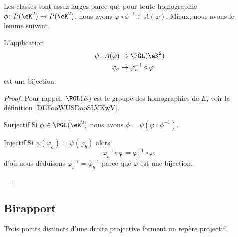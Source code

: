 Les classes sont assez larges parce que pour toute homographie \( \phi\colon P(\eK^2)\to P(\eK^2)\), nous avons \( \varphi\circ\phi^{-1}\in A(\varphi)\). Mieux, nous avons le lemme suivant.

\begin{lemma}
    L'application
    \begin{equation}
        \begin{aligned}
            \psi\colon A(\varphi)&\to \PGL(\eK^2) \\
            \varphi_a&\mapsto \varphi_a^{-1}\circ\varphi 
        \end{aligned}
    \end{equation}
    est une bijection.
\end{lemma}

\begin{proof}
    Pour rappel, \( \PGL(E)\) est le groupe des homographies de \( E\), voir la définition \ref{DEFooWUSDooSLVKwV}.
    \begin{subproof}
    \item[Surjectif]
        Si \( \phi\in\PGL(\eK^2)\) nous avons \( \phi=\psi(\varphi\circ\phi^{-1})\).
    \item[Injectif]
        Si \( \psi(\varphi_a)=\psi(\varphi_b)\) alors
        \begin{equation}
            \varphi_a^{-1}\circ\varphi=\varphi_b^{-1}\circ\varphi,
        \end{equation}
        d'où nous déduisons \( \varphi_a^{-1}=\varphi_b^{-1}\) parce que \( \varphi\) est une bijection.
    \end{subproof}
\end{proof}

\subsection{Birapport}

\begin{lemma}       \label{LEMooXNKOooBKhzyt}
    Trois points distincts d'une droite projective forment un repère projectif.
\end{lemma}

